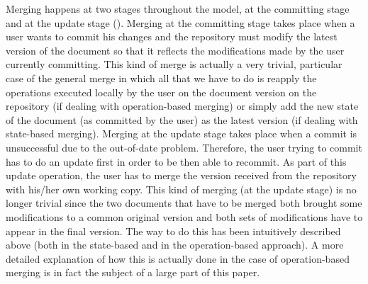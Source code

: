 Merging happens at two stages throughout the model, at the committing stage and at the update
stage (\cite{shen02}). Merging at the committing stage takes place when a user wants to
commit his changes and the repository must modify the latest version of the document so
that it reflects the modifications made by the user currently committing. This kind of merge
is actually a very trivial, particular case of the general merge in which all that we have
to do is reapply the operations executed locally by the user on the document version on the
repository (if dealing with operation-based merging) or simply add the new state of the
document (as committed by the user) as the latest version (if dealing with state-based
merging). Merging at the update stage takes place when a commit is unsuccessful due to the
out-of-date problem. Therefore, the user trying to commit has to do an update first in order
to be then able to recommit. As part of this update operation, the user has to merge the
version received from the repository with his/her own working copy. This kind of merging
(at the update stage) is no longer trivial since the two documents that have to be merged
both brought some modifications to a common original version and both sets of modifications
have to appear in the final version. The way to do this has been intuitively described
above (both in the state-based and in the operation-based approach). A more detailed explanation
of how this is actually done in the case of operation-based merging is in fact the subject
of a large part of this paper.